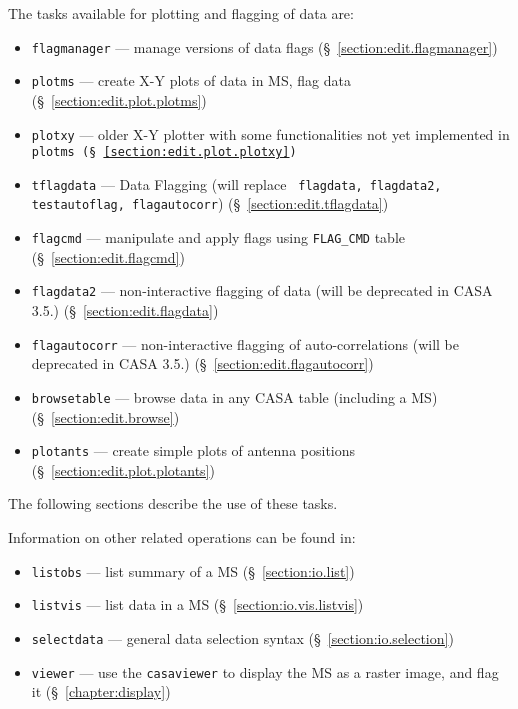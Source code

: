 The tasks available for plotting and flagging of data are:
\begin{itemize}
   \item {\tt flagmanager} --- manage versions of data flags
      (\S~\ref{section:edit.flagmanager})
   \item {\tt plotms} --- create X-Y plots of data in MS, flag data
      (\S~\ref{section:edit.plot.plotms})
   \item {\tt plotxy} --- older X-Y plotter with some functionalities not yet implemented in \tt{plotms}
      (\S~\ref{section:edit.plot.plotxy})
    \item {\tt tflagdata} --- Data Flagging (will replace {\tt
        flagdata, flagdata2, testautoflag, flagautocorr})
      (\S~\ref{section:edit.tflagdata})
   \item {\tt flagcmd} --- manipulate and apply flags using {\tt FLAG\_CMD} table
      (\S~\ref{section:edit.flagcmd})
 \item {\tt flagdata2} --- non-interactive flagging of data (will be deprecated in CASA 3.5.)
      (\S~\ref{section:edit.flagdata})
   \item {\tt flagautocorr} --- non-interactive flagging of auto-correlations (will be deprecated in CASA 3.5.)
      (\S~\ref{section:edit.flagautocorr})
   \item {\tt browsetable} --- browse data in any CASA table (including a MS)
      (\S~\ref{section:edit.browse})
   \item {\tt plotants} --- create simple plots of antenna positions
      (\S~\ref{section:edit.plot.plotants})
\end{itemize}

The following sections describe the use of these tasks.

Information on other related operations can be found in:
\begin{itemize}
   \item {\tt listobs} --- list summary of a MS (\S~\ref{section:io.list})
   \item {\tt listvis} --- list data in a MS (\S~\ref{section:io.vis.listvis})
   \item {\tt selectdata} --- general data selection syntax
      (\S~\ref{section:io.selection})
   \item {\tt viewer} --- use the {\tt casaviewer} to display the MS as a 
      raster image, and flag it (\S~\ref{chapter:display})

\end{itemize}

